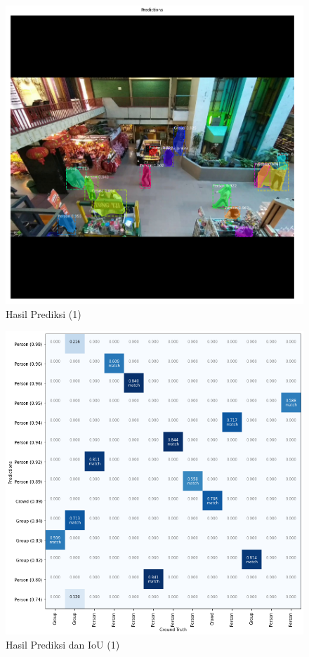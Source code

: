 \begin{figure}[h!]
  \begin{center}
    \includegraphics[width= 0.675\linewidth]{bab4/Contoh Hasil prediksi 1.png}
    \caption{Hasil Prediksi (1)}
    \label{fig: Predictions 1}
  \end{center}
\end{figure}

\begin{figure}[h!]
  \begin{center}
    \includegraphics[width= 0.675\linewidth]{bab4/Contoh Hasil prediksi 1.6.png}
    \caption{Hasil Prediksi dan IoU (1)}
    \label{fig: Predictions and IoU}
  \end{center}
\end{figure}

